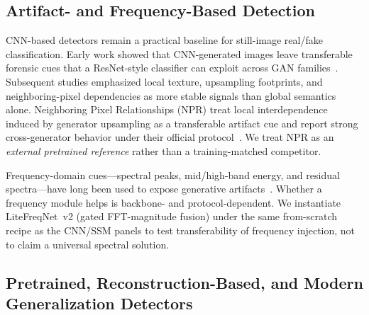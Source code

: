 \subsection{Artifact- and Frequency-Based Detection}
\label{sec:rw-artifact}

CNN-based detectors remain a practical baseline for still-image real/fake classification.
Early work showed that CNN-generated images leave transferable forensic cues that a ResNet-style classifier can exploit across GAN families~\cite{wang2020cnn}.
Subsequent studies emphasized local texture, upsampling footprints, and neighboring-pixel dependencies as more stable signals than global semantics alone.
Neighboring Pixel Relationships (NPR) treat local interdependence induced by generator upsampling as a transferable artifact cue and report strong cross-generator behavior under their official protocol~\cite{tan2024npr}.
We treat NPR as an \emph{external pretrained reference} rather than a training-matched competitor.

Frequency-domain cues---spectral peaks, mid/high-band energy, and residual spectra---have long been used to expose generative artifacts~\cite{frank2020freq,durall2020watch,corvi2023diffusion}.
Whether a frequency module helps is backbone- and protocol-dependent.
We instantiate LiteFreqNet~v2 (gated FFT-magnitude fusion) under the same from-scratch recipe as the CNN/SSM panels to test transferability of frequency injection, not to claim a universal spectral solution.

\subsection{Pretrained, Reconstruction-Based, and Modern Generalization Detectors}
\label{sec:rw-general}

